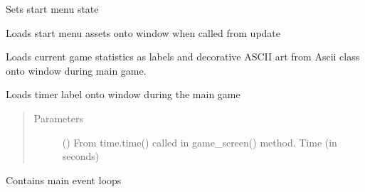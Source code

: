 \documentclass[letterpaper,10pt,english]{sphinxmanual}
\begin{document}
\begin{fulllineitems}
\begin{fulllineitems}
\begin{quote}
\begin{description}
\end{description}\end{quote}

\end{fulllineitems}



\begin{fulllineitems}
Sets start menu state

\end{fulllineitems}



\begin{fulllineitems}
Loads start menu assets onto window when called from update

\end{fulllineitems}



\begin{fulllineitems}
Loads current game statistics as labels  and decorative
ASCII art from Ascii class onto window during main game.

\end{fulllineitems}



\begin{fulllineitems}
Loads timer label onto window during the main game
\begin{quote}\begin{description}
\item[{Parameters}] \leavevmode
{} () \textendash{} From time.time() called in game\_screen() method.
Time (in seconds)

\end{description}\end{quote}

\end{fulllineitems}



\begin{fulllineitems}
Contains main event loops

\end{fulllineitems}




\end{fulllineitems}
\end{document}
